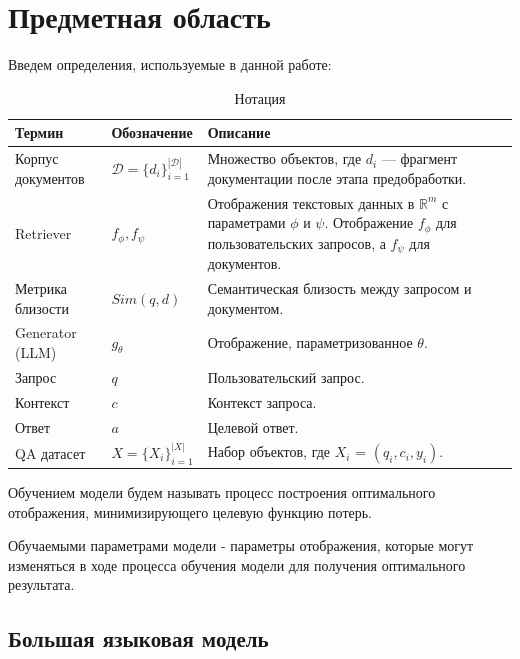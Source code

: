 \section{Предметная область}
\label{subject_area} 

Введем определения, используемые в данной работе:


\begin{table}[ht]
\centering
\caption{Нотация}
\fontsize{12}{14}\selectfont
\renewcommand{\arraystretch}{1.2} %
\begin{tabularx}{\textwidth}{>{\centering\arraybackslash}m{3cm} >{\centering\arraybackslash}m{3cm} >{\centering\arraybackslash}X}
\toprule
\textbf{Термин} & \textbf{Обозначение} & \textbf{Описание} \\
\midrule
Корпус документов & $\mathcal D = \{d_i\}_{i=1}^{|\mathcal D|}$ & Множество объектов, где $d_i$ — фрагмент документации после этапа предобработки. \\
\midrule
Retriever & $f_{\phi}, f_{\psi}$ & Отображения текстовых данных в $\mathbb{R}^m$ с параметрами $\phi$ и $\psi$. Отображение $f_{\phi}$ для пользовательских запросов, а $f_{\psi}$ для документов.\\
\midrule
Метрика близости & $Sim(q,d)$ & Семантическая близость между запросом и документом. \\
\midrule
Generator (LLM) & $g_\theta$ & Отображение, параметризованное $\theta$. \\
\midrule
Запрос & $q$ & Пользовательский запрос. \\
\midrule
Контекст & $c$ & Контекст запроса. \\
\midrule
Ответ & $a$ & Целевой ответ. \\
\midrule
QA датасет & $X = \{X_i\}_{i=1}^{|X|}$ & Набор объектов, где $X_i$ = $(q_i, c_i, y_i)$. \\
\bottomrule
\end{tabularx}
\end{table}


Обучением модели будем называть процесс построения оптимального отображения, минимизирующего целевую функцию потерь.

Обучаемыми параметрами модели - параметры отображения, которые могут изменяться в ходе процесса обучения модели для получения оптимального результата.

\subsection{Большая языковая модель}
\label{subsec:math} 

